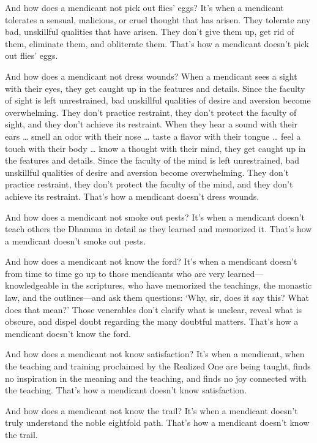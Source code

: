 \documentclass[12pt,openany]{book}%
\begin{document}
And how does a mendicant not pick out flies’ eggs? It’s when a mendicant tolerates a sensual, malicious, or cruel thought that has arisen. They tolerate any bad, unskillful qualities that have arisen. They don’t give them up, get rid of them, eliminate them, and obliterate them. That’s how a mendicant doesn’t pick out flies’ eggs. 

And how does a mendicant not dress wounds? When a mendicant sees a sight with their eyes, they get caught up in the features and details. Since the faculty of sight is left unrestrained, bad unskillful qualities of desire and aversion become overwhelming. They don’t practice restraint, they don’t protect the faculty of sight, and they don’t achieve its restraint. When they hear a sound with their ears … smell an odor with their nose … taste a flavor with their tongue … feel a touch with their body … know a thought with their mind, they get caught up in the features and details. Since the faculty of the mind is left unrestrained, bad unskillful qualities of desire and aversion become overwhelming. They don’t practice restraint, they don’t protect the faculty of the mind, and they don’t achieve its restraint. That’s how a mendicant doesn’t dress wounds. 

And how does a mendicant not smoke out pests? It’s when a mendicant doesn’t teach others the Dhamma in detail as they learned and memorized it. That’s how a mendicant doesn’t smoke out pests. 

And how does a mendicant not know the ford? It’s when a mendicant doesn’t from time to time go up to those mendicants who are very learned—knowledgeable in the scriptures, who have memorized the teachings, the monastic law, and the outlines—and ask them questions: ‘Why, sir, does it say this? What does that mean?’ Those venerables don’t clarify what is unclear, reveal what is obscure, and dispel doubt regarding the many doubtful matters. That’s how a mendicant doesn’t know the ford. 

And how does a mendicant not know satisfaction? It’s when a mendicant, when the teaching and training proclaimed by the Realized One are being taught, finds no inspiration in the meaning and the teaching, and finds no joy connected with the teaching. That’s how a mendicant doesn’t know satisfaction. 

And how does a mendicant not know the trail? It’s when a mendicant doesn’t truly understand the noble eightfold path. That’s how a mendicant doesn’t know the trail. 
\end{document}
